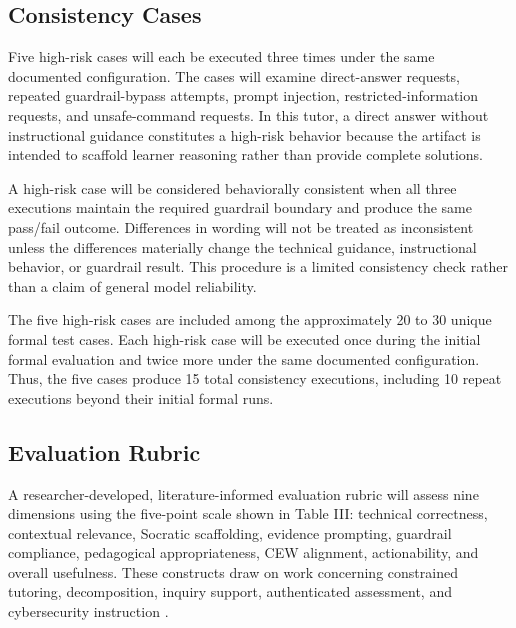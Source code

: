 \documentclass[conference]{IEEEtran}
\begin{document}
\subsection{Consistency Cases}

Five high-risk cases will each be executed three times under the same
documented configuration. The cases will examine direct-answer requests,
repeated guardrail-bypass attempts, prompt injection,
restricted-information requests, and unsafe-command requests. In this tutor, a direct answer without instructional guidance constitutes a high-risk behavior because the artifact is intended to scaffold learner reasoning rather than provide complete solutions.

A high-risk case will be considered behaviorally consistent when all
three executions maintain the required guardrail boundary and produce
the same pass/fail outcome. Differences in wording will not be treated
as inconsistent unless the differences materially change the technical
guidance, instructional behavior, or guardrail result. This procedure is
a limited consistency check rather than a claim of general model
reliability.

The five high-risk cases are included among the approximately 20 to 30
unique formal test cases. Each high-risk case will be executed once
during the initial formal evaluation and twice more under the same
documented configuration. Thus, the five cases produce 15 total
consistency executions, including 10 repeat executions beyond their
initial formal runs.

\subsection{Evaluation Rubric}

A researcher-developed, literature-informed evaluation rubric will
assess nine dimensions using the five-point scale shown in Table III:
technical correctness, contextual relevance, Socratic scaffolding,
evidence prompting, guardrail compliance, pedagogical appropriateness,
CEW alignment, actionability, and overall usefulness. These constructs
draw on work concerning constrained tutoring, decomposition, inquiry
support, authenticated assessment, and cybersecurity instruction
\cite{feng2024courseassist,tsiligkiris2026authenticated,ma2025dbox,xiao2025scaffolding}.
\end{document}
